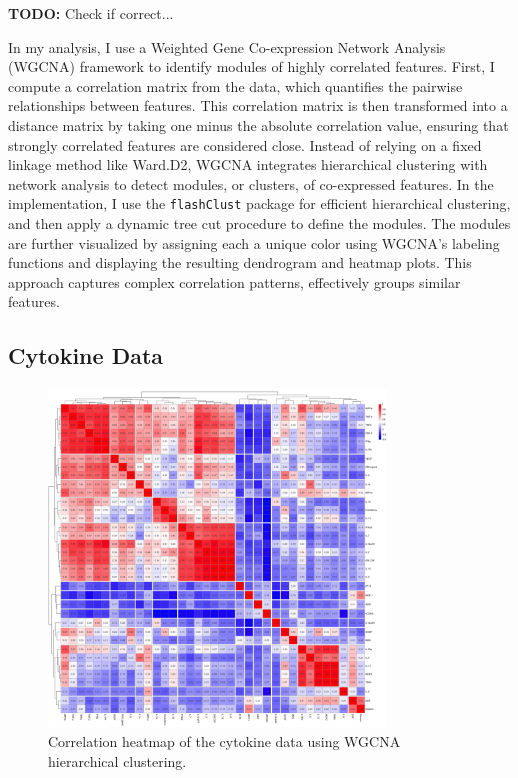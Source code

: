 \documentclass[12pt,a4paper]{report}
\newcommand{\todo}[1]{%
  \par\noindent%
  \begin{tcolorbox}[colback=yellow, colframe=black, boxrule=0.5pt, sharp corners, width=\linewidth, before skip=5pt, after skip=5pt]
    \textbf{TODO:} #1
  \end{tcolorbox}%
  \par
}
\begin{document}
\todo{Check if correct...}
\noindent
In my analysis, I use a Weighted Gene Co-expression Network Analysis (WGCNA) framework to identify modules of highly correlated features. First, I compute a correlation matrix from the data, which quantifies the pairwise relationships between features. This correlation matrix is then transformed into a distance matrix by taking one minus the absolute correlation value, ensuring that strongly correlated features are considered close. Instead of relying on a fixed linkage method like Ward.D2, WGCNA integrates hierarchical clustering with network analysis to detect modules, or clusters, of co-expressed features. In the implementation, I use the \texttt{flashClust} package for efficient hierarchical clustering, and then apply a dynamic tree cut procedure to define the modules. The modules are further visualized by assigning each a unique color using WGCNA’s labeling functions and displaying the resulting dendrogram and heatmap plots. This approach captures complex correlation patterns, effectively groups similar features.

\pagebreak
\subsection{Cytokine Data}
\begin{figure}[H]
  \centering
  \includegraphics[width=0.8\textwidth]{images/Cytokine_euclidean_distance.png}
  \caption[cytokines data correlations]{Correlation heatmap of the cytokine data using  WGCNA hierarchical clustering.}
  \label{fig:cytokine_heatmap}
\end{figure}
\end{document}
